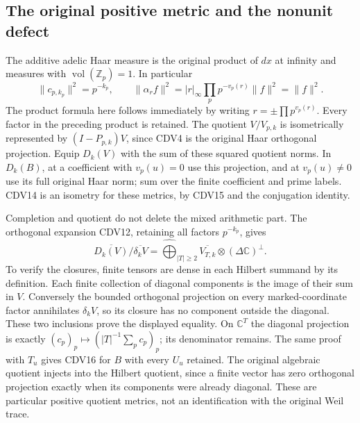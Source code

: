 \subsection{The original positive metric and the nonunit defect}

The additive adelic Haar measure is the original product of $dx$ at
infinity and measures with $\operatorname{vol}(\mathbb Z_p)=1$.
In particular
\begin{equation}\tag{CDV15}
 \|c_{p,k_p}\|^2=p^{-k_p},\qquad
 \|\alpha_rf\|^2=|r|_\infty\prod_p p^{-v_p(r)}\|f\|^2=\|f\|^2.
\end{equation}
The product formula here follows immediately by writing
$r=\pm\prod p^{v_p(r)}$. Every factor in the preceding product
is retained. The quotient $V/V_{p,k}$ is isometrically represented
by $(I-P_{p,k})V$, since CDV4 is the original Haar orthogonal
projection. Equip $D_k(V)$ with the sum of these squared quotient
norms. In $D_k(B)$, at a coefficient with $v_p(u)=0$ use this
projection, and at $v_p(u)\ne0$ use its full original Haar norm;
sum over the finite coefficient and prime labels. CDV14 is an
isometry for these metrics, by CDV15 and the conjugation identity.

Completion and quotient do not delete the mixed arithmetic part.
The orthogonal expansion CDV12, retaining all factors $p^{-k_p}$,
gives
\begin{equation}\tag{CDV16}
 \overline{D_k(V)}/\overline{\delta_kV}
 =\widehat{\bigoplus}_{|T|\ge2}\overline{V_{T,k}}
                  \otimes(\Delta\mathbb C)^\perp.
\end{equation}
To verify the closures, finite tensors are dense in each Hilbert
summand by its definition. Each finite collection of diagonal
components is the image of their sum in $V$. Conversely the
bounded orthogonal projection on every marked-coordinate factor
annihilates $\delta_kV$, so its closure has no component outside
the diagonal. These two inclusions prove the displayed equality.
On $\mathbb C^T$ the diagonal projection is exactly
$(c_p)_p\mapsto(|T|^{-1}\sum_pc_p)_p$; its denominator remains.
The same proof with $T_u$ gives CDV16 for $B$ with every $U_u$
retained. The original algebraic quotient injects into the Hilbert
quotient, since a finite vector has zero orthogonal projection
exactly when its components were already diagonal. These are
particular positive quotient metrics, not an identification with
the original Weil trace.

